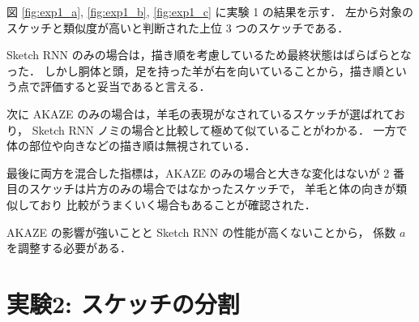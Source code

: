 \documentclass[twocolumn]{jarticle}     %
\begin{document}


図 \ref{fig:exp1_a}, \ref{fig:exp1_b}, \ref{fig:exp1_c} に実験 1 の結果を示す．
左から対象のスケッチと類似度が高いと判断された上位 3 つのスケッチである．

Sketch RNN のみの場合は，描き順を考慮しているため最終状態はばらばらとなった．
しかし胴体と頭，足を持った羊が右を向いていることから，描き順という点で評価すると妥当であると言える．

次に AKAZE のみの場合は，羊毛の表現がなされているスケッチが選ばれており，
Sketch RNN ノミの場合と比較して極めて似ていることがわかる．
一方で体の部位や向きなどの描き順は無視されている．

最後に両方を混合した指標は，AKAZE のみの場合と大きな変化はないが
 2 番目のスケッチは片方のみの場合ではなかったスケッチで，
 羊毛と体の向きが類似しており 比較がうまくいく場合もあることが確認された．

AKAZE の影響が強いことと Sketch RNN の性能が高くないことから，
係数 $a$ を調整する必要がある．


\section{実験2: スケッチの分割}
\end{document}
